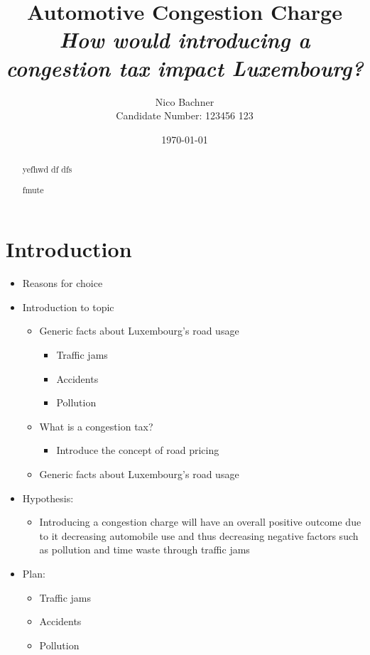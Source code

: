 \documentclass[
      a4paper,
        12pt,
          oneside,
      ]{article}
\title{
    \textbf{Automotive Congestion Charge}\\
    \emph{How would introducing a congestion tax impact Luxembourg?}
      }
\author{
          Nico Bachner\\
          Candidate Number: 123456 123
        }
\date{\today}
\providecommand{\tightlist}{
  \setlength{\itemsep}{0pt}
  \setlength{\parskip}{0pt}
}
\begin{document}
\maketitle
\thispagestyle{empty}

  \begin{abstract}
    yefhwd df dfs

    fmute
  \end{abstract}

      \setcounter{tocdepth}{4}
    \tableofcontents



\hypertarget{introduction}{%
\section{Introduction}\label{introduction}}

\begin{itemize}
\tightlist
\item
  Reasons for choice
\item
  Introduction to topic

  \begin{itemize}
  \tightlist
  \item
    Generic facts about Luxembourg's road usage

    \begin{itemize}
    \tightlist
    \item
      Traffic jams
    \item
      Accidents
    \item
      Pollution
    \end{itemize}
  \item
    What is a congestion tax?

    \begin{itemize}
    \tightlist
    \item
      Introduce the concept of road pricing
    \end{itemize}
  \item
    Generic facts about Luxembourg's road usage
  \end{itemize}
\item
  Hypothesis:

  \begin{itemize}
  \tightlist
  \item
    Introducing a congestion charge will have an overall positive
    outcome due to it decreasing automobile use and thus decreasing
    negative factors such as pollution and time waste through traffic
    jams
  \end{itemize}
\item
  Plan:

  \begin{itemize}
  \tightlist
  \item
    Traffic jams
  \item
    Accidents
  \item
    Pollution
  \end{itemize}
\end{itemize}
\end{document}
